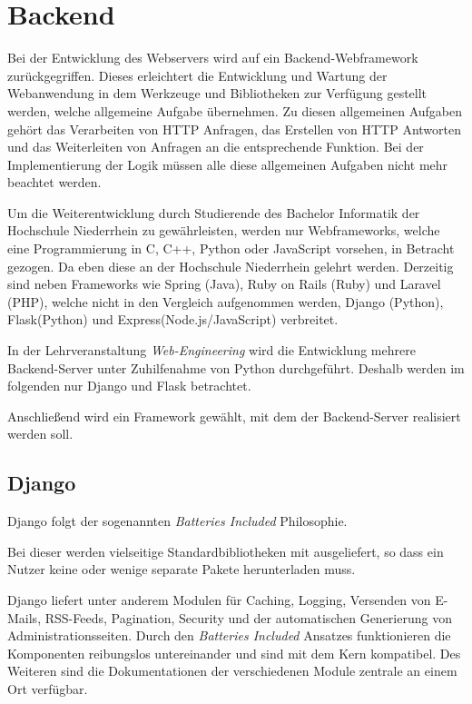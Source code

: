 \section{Backend} \label{sec:Backend}
Bei der Entwicklung des Webservers wird auf ein Backend-Webframework zurückgegriffen. Dieses erleichtert die Entwicklung und Wartung der Webanwendung in dem Werkzeuge und Bibliotheken zur Verfügung gestellt werden, welche allgemeine Aufgabe übernehmen. Zu diesen allgemeinen Aufgaben gehört das Verarbeiten von HTTP Anfragen, das Erstellen von HTTP Antworten und das Weiterleiten von Anfragen an die entsprechende Funktion. Bei der Implementierung der Logik müssen alle diese allgemeinen Aufgaben nicht mehr beachtet werden.

Um die Weiterentwicklung durch Studierende des Bachelor Informatik der Hochschule Niederrhein zu gewährleisten, werden nur Webframeworks, welche eine Programmierung in C, C++, Python oder JavaScript vorsehen, in Betracht gezogen. Da eben diese an der Hochschule Niederrhein gelehrt werden. Derzeitig sind neben Frameworks wie Spring (Java), Ruby on Rails (Ruby) und Laravel (PHP), welche nicht in den Vergleich aufgenommen werden, Django (Python), Flask(Python) und Express(Node.js/JavaScript) verbreitet. \cite{mdncontributorsServersideWebFrameworks2020}

In der Lehrveranstaltung \textit{Web-Engineering} wird die Entwicklung mehrere Backend-Server unter Zuhilfenahme von Python durchgeführt. Deshalb werden im folgenden nur Django und Flask betrachtet. 

Anschließend wird ein Framework gewählt, mit dem der Backend-Server realisiert werden soll.

\subsection{Django}\label{subsec:Django}
Django folgt der sogenannten \textit{Batteries Included} Philosophie. 

Bei dieser werden vielseitige Standardbibliotheken mit ausgeliefert, so dass ein Nutzer keine oder wenige separate Pakete herunterladen muss. \cite{kuchlingPEP206Python}

Django liefert unter anderem Modulen für Caching, Logging, Versenden von E-Mails, RSS-Feeds, Pagination, Security und der automatischen Generierung von Administrationsseiten. \cite{djangoDjangoDocumentationDjango} Durch den \textit{Batteries Included} Ansatzes funktionieren die Komponenten reibungslos untereinander und sind mit dem Kern kompatibel. Des Weiteren sind die Dokumentationen der verschiedenen Module zentrale an einem Ort verfügbar. 

